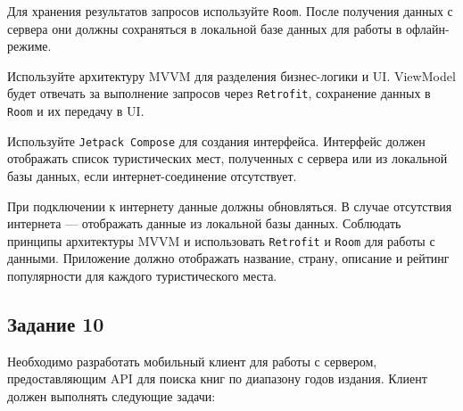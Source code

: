 \documentclass[a4paper,12pt]{article}
\begin{document}
Для хранения результатов запросов используйте \texttt{Room}. После получения данных с сервера они должны сохраняться в локальной базе данных для работы в офлайн-режиме.

Используйте архитектуру MVVM для разделения бизнес-логики и UI. ViewModel будет отвечать за выполнение запросов через \texttt{Retrofit}, сохранение данных в \texttt{Room} и их передачу в UI.

Используйте \texttt{Jetpack Compose} для создания интерфейса. Интерфейс должен отображать список туристических мест, полученных с сервера или из локальной базы данных, если интернет-соединение отсутствует.

При подключении к интернету данные должны обновляться.
В случае отсутствия интернета — отображать данные из локальной базы данных.
Соблюдать принципы архитектуры MVVM и использовать \texttt{Retrofit} и \texttt{Room} для работы с данными.
Приложение должно отображать название, страну, описание и рейтинг популярности для каждого туристического места.

\subsection*{Задание 10}

Необходимо разработать мобильный клиент для работы с сервером, предоставляющим API для поиска книг по диапазону годов издания. Клиент должен выполнять следующие задачи:

\end{document}
